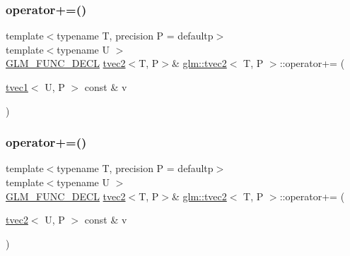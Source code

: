 \mbox{\label{structglm_1_1tvec2_a260a29a9ba826d24f418f01ebd274d39}} 
\subsubsection{\texorpdfstring{operator+=()}{operator+=()}\hspace{0.1cm}{\footnotesize\ttfamily [3/6]}}
{\footnotesize\ttfamily template$<$typename T, precision P = defaultp$>$ \\
template$<$typename U $>$ \\
\mbox{\hyperlink{setup_8hpp_ab2d052de21a70539923e9bcbf6e83a51}{G\+L\+M\+\_\+\+F\+U\+N\+C\+\_\+\+D\+E\+CL}} \mbox{\hyperlink{structglm_1_1tvec2}{tvec2}}$<$T, P$>$\& \mbox{\hyperlink{structglm_1_1tvec2}{glm\+::tvec2}}$<$ T, P $>$\+::operator+= (\begin{DoxyParamCaption}\item[{\mbox{\hyperlink{structglm_1_1tvec1}{tvec1}}$<$ U, P $>$ const \&}]{v }\end{DoxyParamCaption})}

\mbox{\label{structglm_1_1tvec2_a8b512889a3d9ef4536135b1806cb19c4}} 
\subsubsection{\texorpdfstring{operator+=()}{operator+=()}\hspace{0.1cm}{\footnotesize\ttfamily [4/6]}}
{\footnotesize\ttfamily template$<$typename T, precision P = defaultp$>$ \\
template$<$typename U $>$ \\
\mbox{\hyperlink{setup_8hpp_ab2d052de21a70539923e9bcbf6e83a51}{G\+L\+M\+\_\+\+F\+U\+N\+C\+\_\+\+D\+E\+CL}} \mbox{\hyperlink{structglm_1_1tvec2}{tvec2}}$<$T, P$>$\& \mbox{\hyperlink{structglm_1_1tvec2}{glm\+::tvec2}}$<$ T, P $>$\+::operator+= (\begin{DoxyParamCaption}\item[{\mbox{\hyperlink{structglm_1_1tvec2}{tvec2}}$<$ U, P $>$ const \&}]{v }\end{DoxyParamCaption})}


